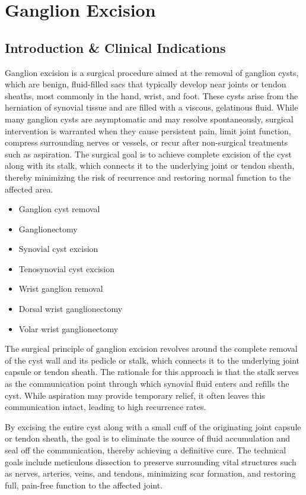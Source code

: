 \chapter{Ganglion Excision}

\section*{Introduction \& Clinical Indications}
Ganglion excision is a surgical procedure aimed at the removal of ganglion cysts, which are benign, fluid-filled sacs that typically develop near joints or tendon sheaths, most commonly in the hand, wrist, and foot. These cysts arise from the herniation of synovial tissue and are filled with a viscous, gelatinous fluid. While many ganglion cysts are asymptomatic and may resolve spontaneously, surgical intervention is warranted when they cause persistent pain, limit joint function, compress surrounding nerves or vessels, or recur after non-surgical treatments such as aspiration. The surgical goal is to achieve complete excision of the cyst along with its stalk, which connects it to the underlying joint or tendon sheath, thereby minimizing the risk of recurrence and restoring normal function to the affected area.

\begin{itemize}
  \item Ganglion cyst removal
  \item Ganglionectomy
  \item Synovial cyst excision
  \item Tenosynovial cyst excision
  \item Wrist ganglion removal
  \item Dorsal wrist ganglionectomy
  \item Volar wrist ganglionectomy
\end{itemize}

The surgical principle of ganglion excision revolves around the complete removal of the cyst wall and its pedicle or stalk, which connects it to the underlying joint capsule or tendon sheath. The rationale for this approach is that the stalk serves as the communication point through which synovial fluid enters and refills the cyst. While aspiration may provide temporary relief, it often leaves this communication intact, leading to high recurrence rates. 

By excising the entire cyst along with a small cuff of the originating joint capsule or tendon sheath, the goal is to eliminate the source of fluid accumulation and seal off the communication, thereby achieving a definitive cure. The technical goals include meticulous dissection to preserve surrounding vital structures such as nerves, arteries, veins, and tendons, minimizing scar formation, and restoring full, pain-free function to the affected joint.

